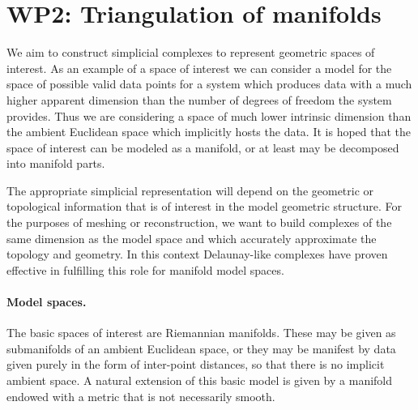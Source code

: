 %

\newcommand{\man}{\mathcal{M}}
\newcommand{\reel}{\mathbb{R}}
\newcommand{\rdee}{\reel^d}
\renewcommand{\pts}{P}
\newcommand{\mesh}{\hat{M}}

\newcommand{\ramsay}[1]{\rred{[[#1]]}}

\section*{WP2: Triangulation of manifolds}

We aim to construct simplicial complexes to represent
geometric spaces of interest. As an example of a space of interest we
can consider a model for the space of possible valid data points for a
system which produces data with a much higher apparent dimension than
the number of degrees of freedom  the system provides. Thus we are
considering a space of much lower intrinsic dimension than the ambient
Euclidean space which implicitly hosts the data. It is hoped that the
space of interest can be modeled as a manifold, or at least may be
decomposed into manifold parts. 

The appropriate simplicial representation will depend on the geometric
or topological information that is of interest in the model geometric
structure. For the purposes of meshing or reconstruction, we want to
build complexes of the same dimension as the model space and which
accurately approximate the topology and geometry. In this context
Delaunay-like complexes have proven effective in fulfilling this role
for manifold model spaces.


\paragraph{Model spaces.} 
The basic spaces of interest are Riemannian manifolds. These may be
given as submanifolds of an ambient Euclidean space, or they may be
manifest by data given purely in the form of inter-point distances, so
that there is no implicit ambient space.  
A natural extension of this basic model is given by a manifold endowed
with a metric that is not necessarily smooth. 

